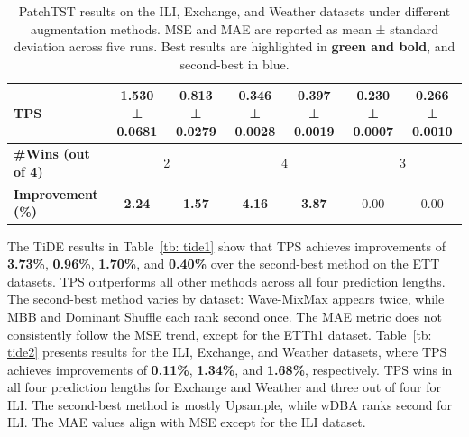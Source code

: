 \begin{table}[h!]
\begin{adjustbox}{max width=\textwidth}
\begin{tabular}{l|cc|cc|cc}
    TPS   & \cellcolor{bestcolor}\textbf{1.530 ± 0.0681} & \cellcolor{bestcolor}\textbf{0.813 ± 0.0279} & \cellcolor{bestcolor}\textbf{0.346 ± 0.0028} & \cellcolor{bestcolor}\textbf{0.397 ± 0.0019} & \cellcolor{bestcolor}\textbf{0.230 ± 0.0007} & \cellcolor{bestcolor}\textbf{0.266 ± 0.0010} \\
    \midrule
    \textbf{\#Wins (out of 4)} & \multicolumn{2}{c|}{2} & \multicolumn{2}{c|}{4} & \multicolumn{2}{c}{3} \\
    \textbf{Improvement (\%)} & \cellcolor{bestcolor} \textbf{2.24} & \cellcolor{bestcolor} \textbf{1.57} & \cellcolor{bestcolor} \textbf{4.16} & \cellcolor{bestcolor} \textbf{3.87} & \cellcolor{baselinecolor}0.00 & \cellcolor{baselinecolor}0.00 \\
    \bottomrule
\end{tabular}
\end{adjustbox}
\caption{PatchTST results on the ILI, Exchange, and Weather datasets under different augmentation methods. MSE and MAE are reported as mean ± standard deviation across five runs. Best results are highlighted in \textbf{green and bold}, and second-best in blue.}
\label{tb: pts2}
\end{table}

The TiDE results in Table~\ref{tb: tide1} show that TPS achieves improvements of \textbf{3.73\%}, \textbf{0.96\%}, \textbf{1.70\%}, and \textbf{0.40\%} over the second-best method on the ETT datasets. TPS outperforms all other methods across all four prediction lengths. The second-best method varies by dataset: Wave-MixMax appears twice, while MBB and Dominant Shuffle each rank second once. The MAE metric does not consistently follow the MSE trend, except for the ETTh1 dataset. Table~\ref{tb: tide2} presents results for the ILI, Exchange, and Weather datasets, where TPS achieves improvements of \textbf{0.11\%}, \textbf{1.34\%}, and \textbf{1.68\%}, respectively. TPS wins in all four prediction lengths for Exchange and Weather and three out of four for ILI. The second-best method is mostly Upsample, while wDBA ranks second for ILI. The MAE values align with MSE except for the ILI dataset.

